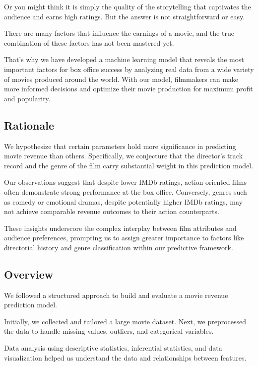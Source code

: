 \documentclass[conference]{IEEEtran}
\begin{document}
        Or you might think it is simply the quality of the storytelling that captivates the audience and earns high ratings.
        But the answer is not straightforward or easy.

        There are many factors that influence the earnings of a movie, and the true combination of these factors has not been mastered yet.

        That’s why we have developed a machine learning model that reveals the most important factors for box office success by analyzing real data from a wide variety of movies produced around the world.
        With our model, filmmakers can make more informed decisions and optimize their movie production for maximum profit and popularity.

    \subsection{Rationale}
        We hypothesize that certain parameters hold more significance in predicting movie revenue than others. Specifically, we conjecture that the director's track record and the genre of the film carry substantial weight in this prediction model.

        Our observations suggest that despite lower IMDb ratings, action-oriented films often demonstrate strong performance at the box office. Conversely, genres such as comedy or emotional dramas, despite potentially higher IMDb ratings, may not achieve comparable revenue outcomes to their action counterparts.

        These insights underscore the complex interplay between film attributes and audience preferences, prompting us to assign greater importance to factors like directorial history and genre classification within our predictive framework.

    \subsection{Overview}

    We followed a structured approach to build and evaluate a movie revenue prediction model.

    Initially, we collected and tailored a large movie dataset. Next, we preprocessed the data to handle missing values, outliers, and categorical variables.

    Data analysis using descriptive statistics, inferential statistics, and data visualization helped us understand the data and relationships between features.
\end{document}
